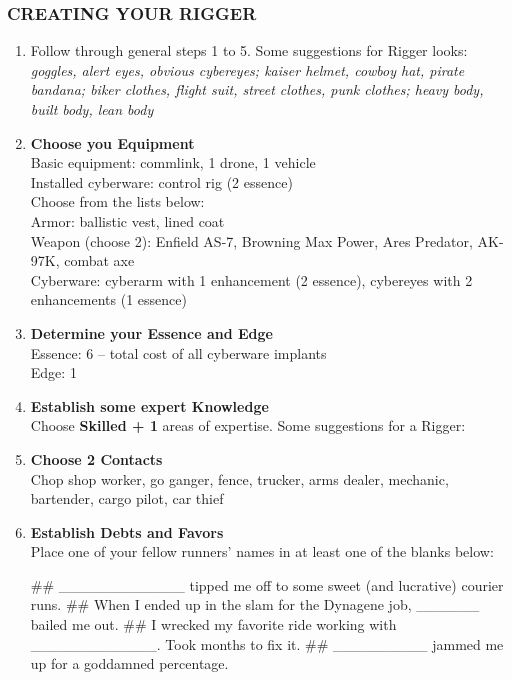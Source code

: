 \subsubsection{CREATING YOUR RIGGER}
\begin{enumerate}
    \item Follow through general steps 1 to 5. Some suggestions for Rigger looks: \textit{goggles, alert eyes, obvious cybereyes; kaiser helmet, cowboy hat, pirate bandana; biker clothes, flight suit, street clothes, punk clothes; heavy body, built body, lean body}
    
    \item \textbf{Choose you Equipment} \\
    Basic equipment: commlink, 1 drone, 1 vehicle \\
    Installed cyberware: control rig (2 essence) \\
    Choose from the lists below: \\
        Armor: ballistic vest, lined coat \\
        Weapon (choose 2): Enfield AS-7, Browning Max Power, Ares Predator, AK-97K, combat axe \\
        Cyberware: cyberarm with 1 enhancement (2 essence), cybereyes with 2 enhancements (1 essence)
    
    \item \textbf{Determine your Essence and Edge} \\
    Essence: 6 – total cost of all cyberware implants \\
    Edge: 1

    \item \textbf{Establish some expert Knowledge} \\
    Choose \textbf{\textsf{Skilled + 1}} areas of expertise. Some suggestions for a Rigger: \textit{}
    
    \item \textbf{Choose 2 Contacts} \\
    Chop shop worker, go ganger, fence, trucker, arms dealer, mechanic, bartender, cargo pilot, car thief
    
    \item \textbf{Establish Debts and Favors} \\
    Place one of your fellow runners’ names in at least one of the blanks below:
        \begin{easylist}
            ## \_\_\_\_\_\_\_\_\_\_\_\_ tipped me off to some sweet (and lucrative) courier runs.
            ## When I ended up in the slam for the Dynagene job, \_\_\_\_\_\_ bailed me out.
            ## I wrecked my favorite ride working with \_\_\_\_\_\_\_\_\_\_\_\_. Took months to fix it.
            ## \_\_\_\_\_\_\_\_\_ jammed me up for a goddamned percentage.
        \end{easylist}
    

\end{enumerate}
